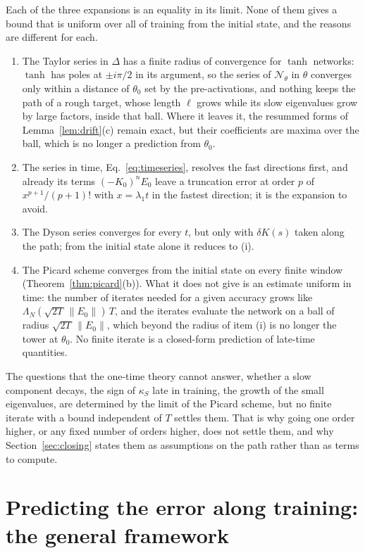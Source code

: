 \documentclass[11pt]{article}
\theoremstyle{definition}
\theoremstyle{remark}
\newcommand{\Net}{\mathcal{N}_\theta}    %
\begin{document}
Each of the three expansions is an equality in its limit.
None of them gives a bound that is uniform over all of training from the initial state, and the reasons are different for each.
\begin{enumerate}[label=(\roman*)]
\item The Taylor series in $\Delta$ has a finite radius of convergence for $\tanh$ networks: $\tanh$ has poles at $\pm i\pi/2$ in its argument, so the series of $\Net$ in $\theta$ converges only within a distance of $\theta_0$ set by the pre-activations, and nothing keeps the path of a rough target, whose length $\ell$ grows while its slow eigenvalues grow by large factors, inside that ball.
Where it leaves it, the resummed forms of Lemma~\ref{lem:drift}(c) remain exact, but their coefficients are maxima over the ball, which is no longer a prediction from $\theta_0$.
\item The series in time, Eq.~\eqref{eq:timeseries}, resolves the fast directions first, and already its terms $(-K_0)^nE_0$ leave a truncation error at order $p$ of $x^{p+1}/(p+1)!$ with $x = \lambda_1t$ in the fastest direction; it is the expansion to avoid.
\item The Dyson series converges for every $t$, but only with $\delta K(s)$ taken along the path; from the initial state alone it reduces to (i).
\item The Picard scheme converges from the initial state on every finite window (Theorem~\ref{thm:picard}(b)).
What it does not give is an estimate uniform in time: the number of iterates needed for a given accuracy grows like $\Lambda_N(\sqrt{2T}\,\|E_0\|)\,T$, and the iterates evaluate the network on a ball of radius $\sqrt{2T}\,\|E_0\|$, which beyond the radius of item (i) is no longer the tower at $\theta_0$.
No finite iterate is a closed-form prediction of late-time quantities.
\end{enumerate}
The questions that the one-time theory cannot answer, whether a slow component decays, the sign of $\kappa_S$ late in training, the growth of the small eigenvalues, are determined by the limit of the Picard scheme, but no finite iterate with a bound independent of $T$ settles them.
That is why going one order higher, or any fixed number of orders higher, does not settle them, and why Section~\ref{sec:closing} states them as assumptions on the path rather than as terms to compute.

\section{Predicting the error along training: the general framework}\label{sec:predict}
\end{document}
